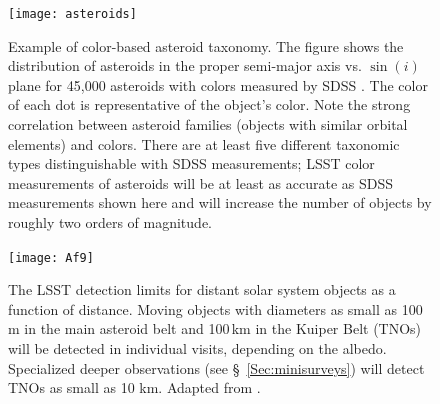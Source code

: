 \begin{figure}
\texttt{[image: asteroids]}
\caption{Example of color-based asteroid taxonomy. The figure
shows the distribution of asteroids in the proper semi-major axis vs. $\sin(i)$
plane for 45,000 asteroids with colors measured by SDSS \citep{2008Icar..198..138P}.
The color of each dot is representative of the object's color.
Note the strong correlation between asteroid families (objects with
similar orbital elements) and colors. There are
at least five different taxonomic types distinguishable with SDSS measurements;
LSST color measurements of asteroids will be
at least as accurate as SDSS measurements shown here
and will increase the number of objects by roughly two orders of magnitude.}
\label{Fig:asteroids}
\end{figure}

\begin{figure}
\texttt{[image: Af9]}
\caption{The LSST detection limits for distant solar system objects as
  a function of distance.
Moving objects with diameters as small as 100\,m in the main asteroid belt and
100\,km in the Kuiper Belt (TNOs) will be detected in individual visits,
depending on the albedo. Specialized deeper observations
(see \S~\ref{Sec:minisurveys}) will detect TNOs as small as 10 km. Adapted from
\citet{2007AAS...21113714J}.}
\label{Fig:Af9}
\end{figure}




